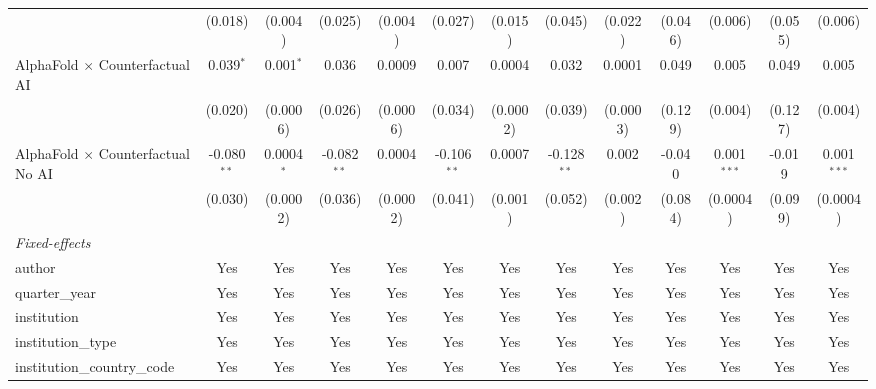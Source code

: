 \begin{tabular}{lcccccccccccc}
                                            & (0.018)       & (0.004)        & (0.025)       & (0.004)        & (0.027)       & (0.015)  & (0.045)       & (0.022)  & (0.046)       & (0.006)        & (0.055)       & (0.006)\\   
   AlphaFold $\times$ Counterfactual AI     & 0.039$^{*}$   & 0.001$^{*}$    & 0.036         & 0.0009         & 0.007         & 0.0004   & 0.032         & 0.0001   & 0.049         & 0.005          & 0.049         & 0.005\\   
                                            & (0.020)       & (0.0006)       & (0.026)       & (0.0006)       & (0.034)       & (0.0002) & (0.039)       & (0.0003) & (0.129)       & (0.004)        & (0.127)       & (0.004)\\   
   AlphaFold $\times$ Counterfactual No AI  & -0.080$^{**}$ & 0.0004$^{*}$   & -0.082$^{**}$ & 0.0004         & -0.106$^{**}$ & 0.0007   & -0.128$^{**}$ & 0.002    & -0.040        & 0.001$^{***}$  & -0.019        & 0.001$^{***}$\\   
                                            & (0.030)       & (0.0002)       & (0.036)       & (0.0002)       & (0.041)       & (0.001)  & (0.052)       & (0.002)  & (0.084)       & (0.0004)       & (0.099)       & (0.0004)\\   
   \midrule
   \emph{Fixed-effects}\\
   author                                   & Yes           & Yes            & Yes           & Yes            & Yes           & Yes      & Yes           & Yes      & Yes           & Yes            & Yes           & Yes\\  
   quarter\_year                            & Yes           & Yes            & Yes           & Yes            & Yes           & Yes      & Yes           & Yes      & Yes           & Yes            & Yes           & Yes\\  
   institution                              & Yes           & Yes            & Yes           & Yes            & Yes           & Yes      & Yes           & Yes      & Yes           & Yes            & Yes           & Yes\\  
   institution\_type                        & Yes           & Yes            & Yes           & Yes            & Yes           & Yes      & Yes           & Yes      & Yes           & Yes            & Yes           & Yes\\  
   institution\_country\_code               & Yes           & Yes            & Yes           & Yes            & Yes           & Yes      & Yes           & Yes      & Yes           & Yes            & Yes           & Yes\\  

\end{tabular}
